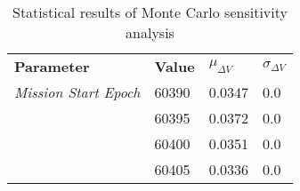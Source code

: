 
                    \begin{table}[]
                    \centering
                    \begin{tabular}{l l l l}
                    \rowcolor[HTML]{EFEFEF} \textbf{Parameter} & \textbf{Value} & \textbf{$\mu_{\Delta V}$} & \textbf{$\sigma_{\Delta V}$} \\
                    \textit{Mission Start Epoch} & 60390 & 0.0347 & 0.0 \\
 & 60395 & 0.0372 & 0.0 \\
 & 60400 & 0.0351 & 0.0 \\
 & 60405 & 0.0336 & 0.0 \\

                    \end{tabular}
                    \caption{Statistical results of Monte Carlo sensitivity analysis}
                    \label{tab:SensitivityAnalysis}
                    \end{table}
                    